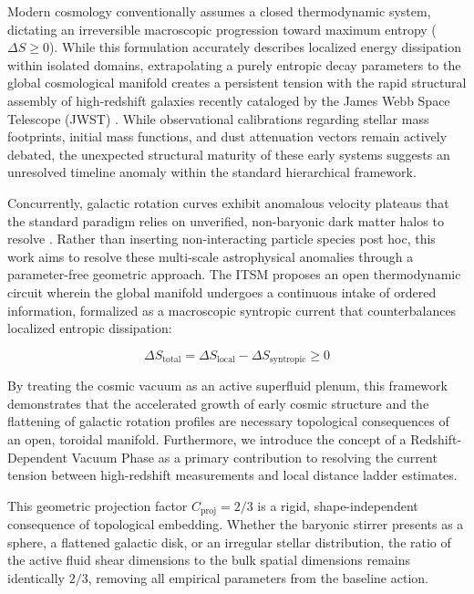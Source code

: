 \documentclass[aps,prd,10pt,onecolumn,superscriptaddress,nofootinbib]{revtex4-2}
\begin{document}
Modern cosmology conventionally assumes a closed thermodynamic system, dictating an irreversible macroscopic progression toward maximum entropy ($\Delta S \ge 0$). While this formulation accurately describes localized energy dissipation within isolated domains, extrapolating a purely entropic decay parameters to the global cosmological manifold creates a persistent tension with the rapid structural assembly of high-redshift galaxies recently cataloged by the James Webb Space Telescope (JWST) \cite{jwst_labbe, jwst_curtis_lake, jwst_carniani}. While observational calibrations regarding stellar mass footprints, initial mass functions, and dust attenuation vectors remain actively debated, the unexpected structural maturity of these early systems suggests an unresolved timeline anomaly within the standard hierarchical framework. 

Concurrently, galactic rotation curves exhibit anomalous velocity plateaus that the standard paradigm relies on unverified, non-baryonic dark matter halos to resolve \cite{rubin}. Rather than inserting non-interacting particle species post hoc, this work aims to resolve these multi-scale astrophysical anomalies through a parameter-free geometric approach. The ITSM proposes an open thermodynamic circuit wherein the global manifold undergoes a continuous intake of ordered information, formalized as a macroscopic syntropic current that counterbalances localized entropic dissipation:

\begin{equation}
\Delta S_{\text{total}} = \Delta S_{\text{local}} - \Delta S_{\text{syntropic}} \ge 0
\end{equation}

By treating the cosmic vacuum as an active superfluid plenum, this framework demonstrates that the accelerated growth of early cosmic structure and the flattening of galactic rotation profiles are necessary topological consequences of an open, toroidal manifold. Furthermore, we introduce the concept of a Redshift-Dependent Vacuum Phase as a primary contribution to resolving the current tension between high-redshift measurements and local distance ladder estimates.

This geometric projection factor $C_{\text{proj}} = 2/3$ is a rigid, shape-independent consequence of topological embedding. Whether the baryonic stirrer presents as a sphere, a flattened galactic disk, or an irregular stellar distribution, the ratio of the active fluid shear dimensions to the bulk spatial dimensions remains identically $2/3$, removing all empirical parameters from the baseline action. 
\end{document}
